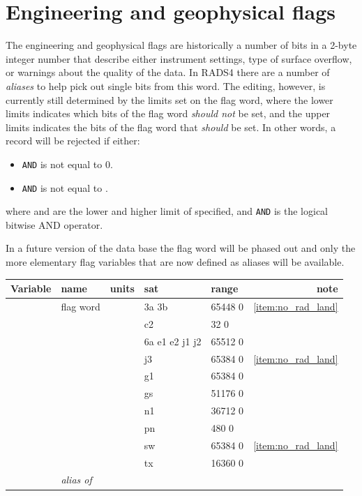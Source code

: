 \documentclass[a4paper,11pt,openany,natbib,nomargin]{thesis}
\newcommand\alias[1]{\emph{alias of} \var{#1}}
\newenvironment{vartable}{
\begin{table}[ht]
\small
\begin{tabular}{lllllr}
\hline\hline
Variable & name & units & sat & range & note \\
\hline\hline
}{
\hline
\end{tabular}
\end{table}
}
\begin{document}
\section{Engineering and geophysical flags}
\label{var:flags}
The engineering and geophysical flags are historically a number of bits in a 2-byte integer number that describe either instrument settings, type of surface overflow, or warnings about the quality of the data. In RADS4 there are a number of \emph{aliases} to help pick out single bits from this word. The editing, however, is currently still determined by the limits set on the flag word, where the lower limits indicates which bits of the flag word \emph{should not} be set, and the upper limits indicates the bits of the flag word that \emph{should} be set. In other words, a record will be rejected if either:
\begin{itemize}
\item {} \verb|AND|  is not equal to 0.
\item {} \verb|AND|  is not equal to .
\end{itemize}
where  and  are the lower and higher limit of  specified, and \verb|AND| is the logical bitwise AND operator.

In a future version of the data base the flag word  will be phased out and only the more elementary flag variables that are now defined as aliases will be available.

\begin{vartable}
\var{flags} & flag word & & 3a 3b & 65448 0 & \ref{item:no_rad_land} \\
            &           & & c2 & 32 0 & \\
            &           & & 6a e1 e2 j1 j2 & 65512 0 & \\
            &           & & j3 & 65384 0 & \ref{item:no_rad_land} \\
            &           & & g1 & 65384 0 & \\
            &           & & gs & 51176 0 & \\
            &           & & n1 & 36712 0 & \\
            &           & & pn & 480 0 & \\
            &           & & sw & 65384 0 & \ref{item:no_rad_land} \\
            &           & & tx & 16360 0 & \\
\hline
            & \alias{flags} & & & & \\
\end{vartable}
\end{document}
